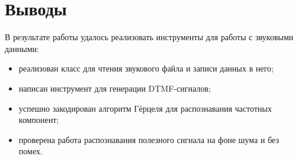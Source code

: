 \section{Выводы} \label{ch2:conclusion}

В результате работы удалось реализовать инструменты для работы с звуковыми данными:

\begin{itemize}
	\item реализован класс для чтения звукового файла и записи данных в него;
	\item написан инструмент для генерации DTMF-сигналов;
	\item успешно закодирован алгоритм Гёрцеля для распознавания частотных компонент;
	\item проверена работа распознавания полезного сигнала на фоне шума и без помех.
\end{itemize}


%
\newpage %
